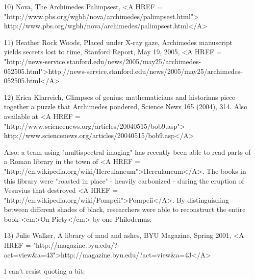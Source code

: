 10) Nova, The Archimedes Palimpsest, 
<A HREF = "http://www.pbs.org/wgbh/nova/archimedes/palimpsest.html">
http://www.pbs.org/wgbh/nova/archimedes/palimpsest.html</A>

11) Heather Rock Woods, Placed under X-ray gaze, Archimedes 
manuscript yields secrets lost to time, Stanford Report, May 19, 2005, 
<A HREF = "http://news-service.stanford.edu/news/2005/may25/archimedes-052505.html">http://news-service.stanford.edu/news/2005/may25/archimedes-052505.html</A>

12) Erica Klarreich, Glimpses of genius: mathematicians and
historians piece together a puzzle that Archimedes pondered,
Science News 165 (2004), 314.  Also available at
<A HREF = "http://www.sciencenews.org/articles/20040515/bob9.asp">
http://www.sciencenews.org/articles/20040515/bob9.asp</A>

Also: a team using "multispectral imaging" has recently been able 
to read parts of a Roman library in the town of 
<A HREF = "http://en.wikipedia.org/wiki/Herculaneum">Herculaneum</A>.  
The books in this library were "roasted in place" -
heavily carbonized - during the eruption of Vesuvius that destroyed 
<A HREF = "http://en.wikipedia.org/wiki/Pompeii">Pompeii</A>. 
By distinguishing between different shades of 
black, researchers were able to reconstruct the entire book <em>On 
Piety</em> by one Philodemus:

13) Julie Walker, A library of mud and ashes, BYU Magazine, Spring
2001, <A HREF = "http://magazine.byu.edu/?act=view&a=43">http://magazine.byu.edu/?act=view&a=43</A>

I can't resist quoting a bit:

